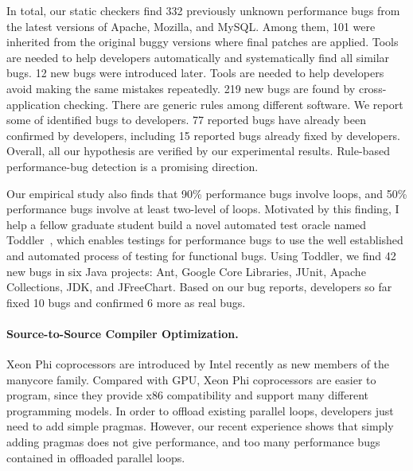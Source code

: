 \documentclass[10pt]{article}
\begin{document}
In total, our static checkers find 332 previously unknown performance bugs from the latest versions of Apache, Mozilla, and MySQL. 
Among them, 101 were inherited from the original buggy versions where final patches are applied. 
Tools are needed to help developers automatically and systematically find all similar bugs. 
12 new bugs were introduced later. 
Tools are needed to help developers avoid making the same mistakes repeatedly. 
219 new bugs are found by cross-application checking. There are generic rules among different software. 
We report some of identified bugs to developers. 
77 reported bugs have already been confirmed by developers, including 15 reported bugs already fixed by developers. 
Overall, all our hypothesis are verified by our experimental results. Rule-based performance-bug detection is a promising direction.

Our empirical study also finds that 90\% performance bugs involve loops, 
and 50\% performance bugs involve at least two-level of loops. 
Motivated by this finding, I help a fellow graduate student build a novel automated test oracle named Toddler~\cite{Nistor13ICSE}, 
which enables testings for performance bugs to use the well established and automated process of testing for functional bugs. 
Using Toddler, we find 42 new bugs in six Java projects: 
Ant, Google Core Libraries, JUnit, Apache Collections, JDK, and JFreeChart. 
Based on our bug reports, developers so far fixed 10 bugs and confirmed 6 more as real bugs.


\paragraph{Source-to-Source Compiler Optimization.}
Xeon Phi coprocessors are introduced by Intel recently as new members of the manycore family. 
Compared with GPU, Xeon Phi coprocessors are easier to program, 
since they provide x86 compatibility and support many different programming models. 
In order to offload existing parallel loops, developers just need to add simple pragmas. 
However, our recent experience shows that simply adding pragmas does not give performance, 
and too many performance bugs contained in offloaded parallel loops. 
\end{document}
